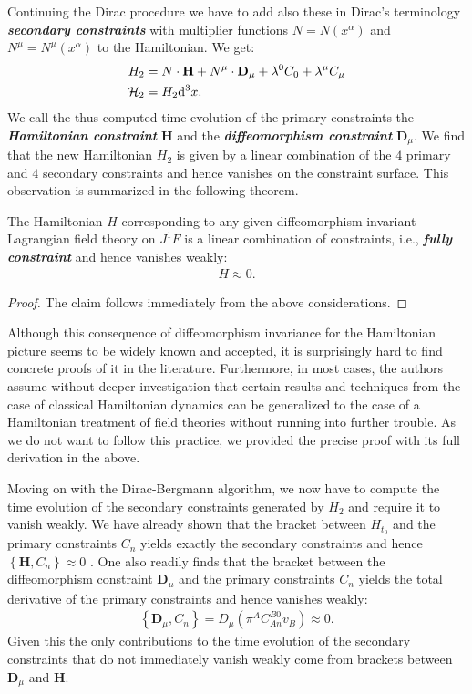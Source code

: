 Continuing the Dirac procedure we have to add also these in Dirac's terminology \textit{\textbf{secondary constraints}} with multiplier functions $N=N(x^{\alpha})$ and $N^{\mu}= N^{\mu}(x^{\alpha})$ to the Hamiltonian. We get:
\begin{align}
\begin{aligned}
H_{2} &= N \cdot \mathbf{H} + N^{\mu} \cdot \mathbf{D}_{\mu} + \lambda^0 C_0 + \lambda^{\mu}C_{\mu}\\
\smallskip
\mathcal{H}_2 &= H_2 \mathrm{d}^3x.
\end{aligned}
\end{align}
We call the thus computed time evolution of the primary constraints the \textit{\textbf{Hamiltonian constraint}} $\mathbf{H}$ and the \textit{\textbf{diffeomorphism constraint}} $\mathbf{D}_{\mu}$.
We find that the new Hamiltonian $H_{2}$ is given by a linear combination of the $4$ primary and $4$ secondary constraints and hence vanishes on the constraint surface. This observation is summarized in the following theorem.
\begin{theorem}
The Hamiltonian $H$ corresponding to any given diffeomorphism invariant Lagrangian field theory on $J^1F$ is a linear combination of constraints, i.e., \textbf{\textit{fully constraint}} and hence vanishes weakly:
\begin{align}
   H \approx 0.
\end{align}
\end{theorem}
\begin{proof}
The claim follows immediately from the above considerations.
\end{proof}
\begin{remark}
Although this consequence of diffeomorphism invariance for the Hamiltonian picture seems to be widely known and accepted, it is surprisingly hard to find concrete proofs of it in the literature. Furthermore, in most cases, the authors assume without deeper investigation that certain results and techniques from the case of classical Hamiltonian dynamics can be generalized to the case of a Hamiltonian treatment of field theories without running into further trouble. As we do not want to follow this practice, we provided the precise proof with its full derivation in the above.
\end{remark}

Moving on with the Dirac-Bergmann algorithm, we now have to compute the time evolution of the secondary constraints generated by $H_2$ and require it to vanish weakly. We have already shown that the bracket between $H_{t_0}$ and the primary constraints $C_n$ yields exactly the secondary constraints and hence $\left \{\mathbf{H}, C_n \right \} \approx 0$  . One also readily finds that the bracket between the diffeomorphism constraint $\mathbf{D}_{\mu}$ and the primary constraints $C_n$ yields the total derivative of the primary constraints and hence vanishes weakly:
\begin{align}
    \left \{\mathbf{D}_{\mu}, C_n \right \} = D_{\mu} (\pi^A C_{An}^{B0}v_B) \approx 0.
\end{align}
Given this the only contributions to the time evolution of the secondary constraints that do not immediately vanish weakly come from brackets between $\mathbf{D}_{\mu}$ and $\mathbf{H}$. 

